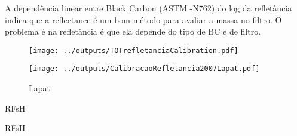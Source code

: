 A dependência linear entre Black Carbon (ASTM -N762) do log da refletância indica
que a reflectance é um bom método para avaliar a massa no filtro. 
O problema é na refletância é que ela depende do tipo de BC e de filtro. 

\begin{figure}[H]
\begin{center}
  \texttt{[image: ../outputs/TOTrefletanciaCalibration.pdf]}
  \caption{}
\end{center}
\end{figure}
  
\begin{figure}[H]
\begin{center}
  \texttt{[image: ../outputs/CalibracaoRefletancia2007Lapat.pdf]}
  \caption{Lapat }
\end{center}
\end{figure}

\begin{table}[H]
  \centering
  \caption{RFsH}
  
\end{table}

\begin{table}[H]
  \centering
  \caption{RFsH}
  
\end{table}




